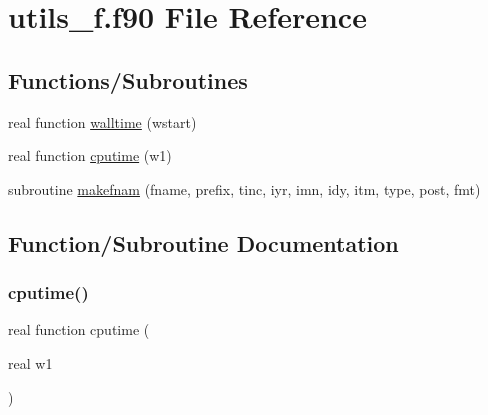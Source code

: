 \hypertarget{utils__f_8f90}{}\section{utils\+\_\+f.\+f90 File Reference}
\label{utils__f_8f90}
\subsection*{Functions/\+Subroutines}
\begin{DoxyCompactItemize}
\item 
real function \hyperlink{utils__f_8f90_ad3ffdbdf7c50b9d7de84489e2e30eec5}{walltime} (wstart)
\item 
real function \hyperlink{utils__f_8f90_a32464b8a92b137317417bbae8102c3ac}{cputime} (w1)
\item 
subroutine \hyperlink{utils__f_8f90_a8918adb41c1a9ae40d85373da53742db}{makefnam} (fname, prefix, tinc, iyr, imn, idy, itm, type, post, fmt)
\end{DoxyCompactItemize}


\subsection{Function/\+Subroutine Documentation}
\mbox{\label{utils__f_8f90_a32464b8a92b137317417bbae8102c3ac}} 
\subsubsection{\texorpdfstring{cputime()}{cputime()}}
{\footnotesize\ttfamily real function cputime (\begin{DoxyParamCaption}\item[{real}]{w1 }\end{DoxyParamCaption})}

\mbox{\label{utils__f_8f90_a8918adb41c1a9ae40d85373da53742db}} 
